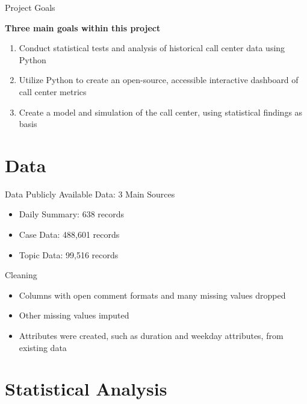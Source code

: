 \documentclass{beamer}
\begin{document}
\begin{frame}{Project Goals}
\begin{center}
\textbf{Three main goals within this project}
\end{center}
\begin{enumerate}
    \item Conduct statistical tests and analysis of historical call center data using Python
     \item Utilize Python to create an open-source, accessible interactive dashboard of call center metrics
     \item Create a model and simulation of the call center, using statistical findings as basis
\end{enumerate}
\end{frame}



\section{Data}

\begin{frame}{Data}
Publicly Available Data: 3 Main Sources
\begin{itemize}
    \item Daily Summary: 638 records
    \item Case Data: 488,601 records
    \item Topic Data: 99,516 records
\end{itemize}
Cleaning
\begin{itemize}
    \item Columns with open comment formats and many missing values dropped
    \item Other missing values imputed
    \item Attributes were created, such as duration and weekday attributes, from existing data
\end{itemize}
\end{frame}





\section{Statistical Analysis} 
\end{document}
